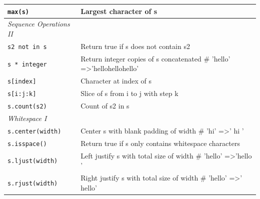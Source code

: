 \documentclass[a4paper,11pt]{book}
\begin{document}
\begin{appendices}
\begin{table}[!htbp]
\begin{tabular}{lp{11cm}}
\texttt{max(s)              }     & Largest character of s                                                                                                                          \\ \midrule 
\textit{Sequence Operations II}   &                                                                                                                                                 \\ \midrule
\texttt{s2 not in s        }      & Return true if s does not contain s2                                                                                                            \\
\texttt{s * integer           }   & Return integer copies of s concatenated \# 'hello' =\textgreater 'hellohellohello'                                                              \\
\texttt{s{[}index{]}           }  & Character at index of s                                                                                                                         \\
\texttt{s{[}i:j:k{]}          }   & Slice of s from i to j with step k                                                                                                              \\
\texttt{s.count(s2)           }   & Count of s2 in s                                                                                                                                \\ \midrule
\textit{Whitespace I}             &                                                                                                                                                 \\ \midrule
\texttt{s.center(width)      }    & Center s with blank padding of width \# 'hi' =\textgreater ' hi '                                                                               \\
\texttt{s.isspace()          }    & Return true if s only contains whitespace characters                                                                                            \\
\texttt{s.ljust(width)      }     & Left justify s with total size of width \# 'hello' =\textgreater 'hello '                                                                      \\
\texttt{s.rjust(width)     }      & Right justify s with total size of width \# 'hello' =\textgreater ' hello'                                                                      \\

\end{tabular}
\end{table}
\end{appendices}
\end{document}
